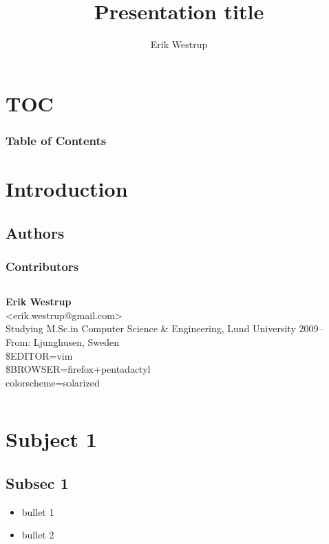 \documentclass[aspectratio=169, 10pt]{beamer}
\title{Presentation title}
\author{Erik Westrup}
\institute[]
{%
	Lund University, Sweden
}
\makeatletter
\newcommand*{\currSectionName}{\@currentlabelname}
\makeatother
\begin{document}
{%
\begin{frame}[plain]
	\titlepage%
\end{frame}
}
\section[]{TOC}
\begin{frame}
	\frametitle{Table of Contents}
	\tableofcontents[currentsection]
\end{frame}
\section{Introduction}
\subsection{Authors}
\begin{frame}
	\frametitle{Contributors}
	\begin{columns}[c]
	\begin{column}{7cm}
		{\bfseries Erik Westrup} \\
		{\normalsize
		<erik.westrup@gmail.com> \\
		Studying M.Sc.\@ in Computer Science \& Engineering,
		Lund University 2009-- \\
		From: Ljunghusen, Sweden \\
		\$EDITOR=vim \\
		\$BROWSER=firefox+pentadactyl \\
		colorscheme=solarized \\
		}
	\end{column}
	\begin{column}[c]{7cm}
	\end{column}
	\end{columns}
\end{frame}
\section{Subject 1}
\begin{frame}
	\begin{center}
		\huge{\currSectionName}
	\end{center}
\end{frame}
\subsection{Subsec 1}
\begin{frame}
	\begin{itemize}
		\item bullet 1
		\item bullet 2
	\end{itemize}
\end{frame}
\end{document}
